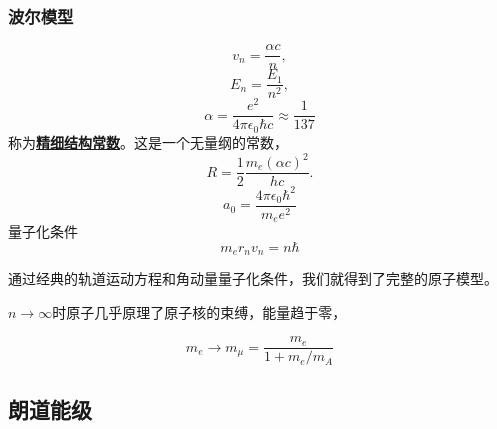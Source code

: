 \documentclass[UTF8, a4paper]{ctexart}
\newcommand{\concept}[1]{\underline{\textbf{#1}}}
\begin{document}
\subsubsection{波尔模型}

\[
    v_n = \frac{\alpha c}{n},
\]
\[
    E_n = \frac{E_1}{n^2},
\]
\begin{equation}
    \alpha = \frac{e^2}{4\pi \epsilon_0 \hbar c} \approx \frac{1}{137}
\end{equation}
称为\concept{精细结构常数}。这是一个无量纲的常数，
\[
    R = \frac{1}{2} \frac{m_e (\alpha c)^2}{hc}.
\]
\[
    a_0 = \frac{4\pi\epsilon_0 \hbar^2}{m_e e^2}
\]
量子化条件
\begin{equation}
    m_e r_n v_n = n \hbar
\end{equation}

通过经典的轨道运动方程和角动量量子化条件，我们就得到了完整的原子模型。

$n\to\infty$时原子几乎原理了原子核的束缚，能量趋于零，

\[
    m_e \longrightarrow m_\mu = \frac{m_e}{1 + m_e/m_A}
\]

\subsection{朗道能级}
\end{document}

